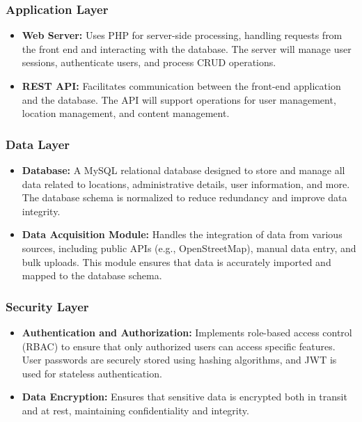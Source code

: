 \subsubsection{Application Layer}
\begin{itemize}
    \item \textbf{Web Server:} Uses PHP for server-side processing, handling requests from the front end and interacting with the database. The server will manage user sessions, authenticate users, and process CRUD operations.
    \item \textbf{REST API:} Facilitates communication between the front-end application and the database. The API will support operations for user management, location management, and content management.
\end{itemize}

\subsubsection{Data Layer}
\begin{itemize}
    \item \textbf{Database:} A MySQL relational database designed to store and manage all data related to locations, administrative details, user information, and more. The database schema is normalized to reduce redundancy and improve data integrity.
    \item \textbf{Data Acquisition Module:} Handles the integration of data from various sources, including public APIs (e.g., OpenStreetMap), manual data entry, and bulk uploads. This module ensures that data is accurately imported and mapped to the database schema.
\end{itemize}

\subsubsection{Security Layer}
\begin{itemize}
    \item \textbf{Authentication and Authorization:} Implements role-based access control (RBAC) to ensure that only authorized users can access specific features. User passwords are securely stored using hashing algorithms, and JWT is used for stateless authentication.
    \item \textbf{Data Encryption:} Ensures that sensitive data is encrypted both in transit and at rest, maintaining confidentiality and integrity.
\end{itemize}

